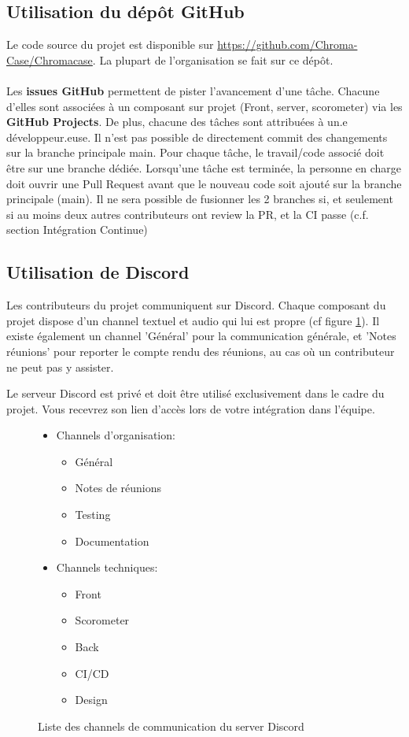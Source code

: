 \subsection{Utilisation du dépôt GitHub}
	Le code source du projet est disponible sur \url{https://github.com/Chroma-Case/Chromacase}.
	La plupart de l’organisation se fait sur ce dépôt.
	\\\\
	Les \textbf{issues GitHub} permettent de pister l’avancement d’une tâche. Chacune d’elles sont associées à un composant sur projet (Front, server, scorometer) via les \textbf{GitHub Projects}. De plus, chacune des tâches sont attribuées à un.e développeur.euse.
	Il n’est pas possible de directement commit des changements sur la branche principale main. Pour chaque tâche, le travail/code associé doit être sur une branche dédiée.
	Lorsqu’une tâche est terminée, la personne en charge doit ouvrir une Pull Request avant que le nouveau code soit ajouté sur la branche principale (main). Il ne sera possible de fusionner les 2 branches si, et seulement si au moins deux autres contributeurs ont review la PR, et la CI passe (c.f. section Intégration Continue)

\subsection{Utilisation de Discord}
	Les contributeurs du projet communiquent sur Discord. Chaque composant du projet dispose d’un channel textuel et audio qui lui est propre (cf figure \ref{fig:discord-chans}). Il existe également un channel 'Général' pour la communication générale, et 'Notes réunions' pour reporter le compte rendu des réunions, au cas où un contributeur ne peut pas y assister.

	Le serveur Discord est privé et doit être utilisé exclusivement dans le cadre du projet. Vous recevrez son lien d'accès lors de votre intégration dans l'équipe.

	\begin{figure}[H]
		\begin{itemize}
			\item Channels d'organisation:
			\begin{itemize} 
				\item Général
				\item Notes de réunions
				\item Testing
				\item Documentation
			\end{itemize}
			\item Channels techniques:
			\begin{itemize} 
				\item Front
				\item Scorometer
				\item Back
				\item CI/CD
				\item Design
			\end{itemize}
		\end{itemize}
		\caption{Liste des channels de communication du server Discord}
		\label{fig:discord-chans}
	\end{figure}

